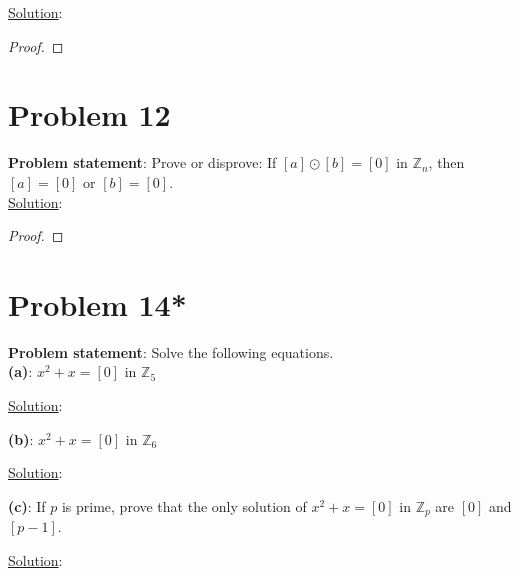 \documentclass{article} %
\begin{document}
\underline{Solution}: 
\begin{addmargin}[1em]{0em}
\begin{proof}

\end{proof}
\end{addmargin}

\newpage

\section*{Problem 12}


\textbf{Problem statement}: Prove or disprove: If $[a] \odot [b] = [0]$ in $\mathbb{Z}_n$, then $[a] = [0]$ or $[b] = [0]$.
\\

\underline{Solution}: 
\begin{addmargin}[1em]{0em}
\begin{proof}

\end{proof}
\end{addmargin}

\newpage

\section*{Problem 14*}


\textbf{Problem statement}: Solve the following equations.
\\

\textbf{(a)}: $x^2 + x = [0]$ in $\mathbb{Z}_5$
\\
\begin{addmargin}[1em]{0em}
\underline{Solution}: 
\begin{addmargin}[1em]{0em}
\end{addmargin}
\end{addmargin}

\textbf{(b)}: $x^2 + x = [0]$ in $\mathbb{Z}_6$
\\
\begin{addmargin}[1em]{0em}
\underline{Solution}: 
\begin{addmargin}[1em]{0em}
\end{addmargin}
\end{addmargin}

\textbf{(c)}: If $p$ is prime, prove that the only solution of $x^2 + x = [0]$ in $\mathbb{Z}_p$ are $[0]$ and $[p-1]$.
\\
\begin{addmargin}[1em]{0em}
\underline{Solution}: 
\begin{addmargin}[1em]{0em}
\end{addmargin}
\end{addmargin}
\end{document}
